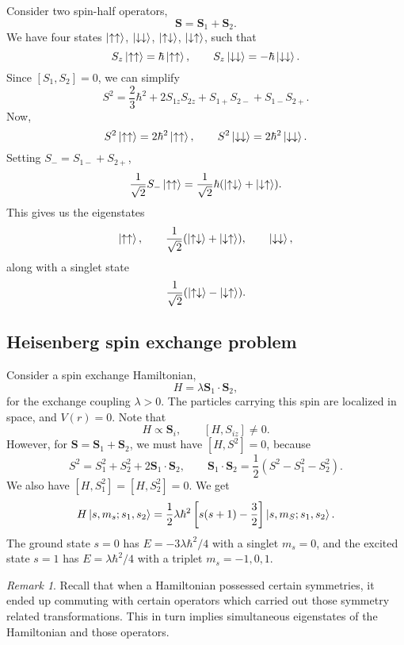 \documentclass[11pt]{article}
\newcommand\ve[1]{\boldsymbol{#1}}
\def\vS{\ve{S}}
\theoremstyle{definition}
\theoremstyle{remark}
\newtheorem*{remark}{Remark}
\numberwithin{equation}{section}
\begin{document}
    Consider two spin-half operators, \[
        \vS = \vS_1 + \vS_2.
    \] We have four states $\ket{\uparrow\uparrow}$, $\ket{\downarrow\downarrow}$,
    $\ket{\uparrow\downarrow}$, $\ket{\downarrow\uparrow}$, such that \[
        S_z\ket{\uparrow\uparrow} = \hbar \ket{\uparrow\uparrow}, \qquad
        S_z\ket{\downarrow\downarrow} = -\hbar\ket{\downarrow\downarrow}.
    \] Since $[S_1, S_2] = 0$, we can simplify \[
        S^2 = \frac{2}{3}\hbar^2 + 2S_{1z}S_{2z} + S_{1+}S_{2-} + S_{1-}S_{2+}.
    \] Now, \[
        S^2\ket{\uparrow\uparrow} = 2\hbar^2\ket{\uparrow\uparrow}, \qquad
        S^2\ket{\downarrow\downarrow} = 2\hbar^2\ket{\downarrow\downarrow}.
    \] Setting $S_- = S_{1-} + S_{2+}$, \[
        \frac{1}{\sqrt{2}}S_-\ket{\uparrow\uparrow} =
        \frac{1}{\sqrt{2}}\hbar(\ket{\uparrow\downarrow} + \ket{\downarrow\uparrow}).
    \] This gives us the eigenstates \[
        \ket{\uparrow\uparrow}, \qquad \frac{1}{\sqrt{2}}(\ket{\uparrow\downarrow} +
        \ket{\downarrow\uparrow}), \qquad \ket{\downarrow\downarrow},
    \] along with a singlet state \[
        \frac{1}{\sqrt{2}}(\ket{\uparrow\downarrow} - \ket{\downarrow\uparrow}).
    \] 

    \subsection{Heisenberg spin exchange problem}
    Consider a spin exchange Hamiltonian, \[
        H = \lambda\vS_1\cdot\vS_2,
    \] for the exchange coupling $\lambda > 0$. The particles carrying this spin are
    localized in space, and $V(r) = 0$. Note that \[
        H \propto \vS_i, \qquad [H, S_{iz}] \neq 0.
    \] However, for $\vS = \vS_1 + \vS_2$, we must have $[H, S^2] = 0$, because \[
        S^2 = S_1^2 + S_2^2 + 2\vS_1\cdot\vS_2, \qquad \vS_1\cdot\vS_2 =
        \frac{1}{2}(S^2 - S_1^2 - S_2^2).
    \] We also have $[H, S_1^2] = [H, S_2^2] = 0$. We get \[
        H\ket{s, m_s; s_1, s_2} = \frac{1}{2}\lambda\hbar^2\left[s(s + 1) -
        \frac{3}{2}\right]\ket{s, m_S; s_1, s_2}.
    \] The ground state $s = 0$ has $E = -3\lambda \hbar^2 / 4$ with a singlet $m_s
    = 0$, and the excited state $s = 1$ has $E = \lambda\hbar^2 / 4$ with a triplet
    $m_s = -1, 0, 1$.


    \begin{remark}
        Recall that when a Hamiltonian possessed certain symmetries, it ended up
        commuting with certain operators which carried out those symmetry related
        transformations. This in turn implies simultaneous eigenstates of the
        Hamiltonian and those operators.
    \end{remark}
\end{document}
